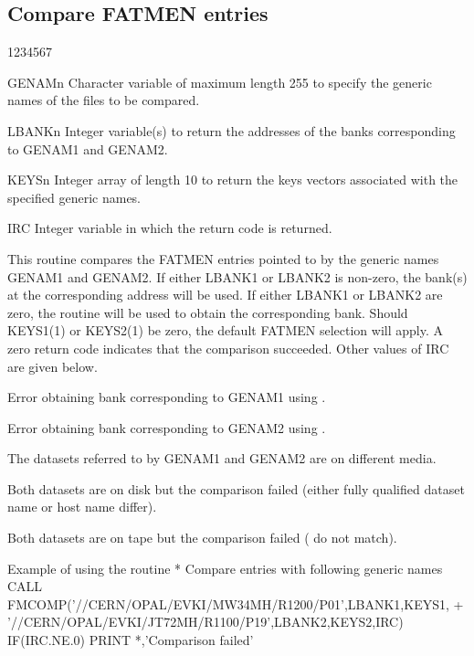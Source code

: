\subsection{Compare FATMEN entries}
\begin{DLtt}{1234567}
\item[GENAMn]
Character variable of maximum length 255 to specify the generic names
of the files to be compared.
\item[LBANKn]
Integer variable(s) to return the addresses of the banks
corresponding to GENAM1 and GENAM2.
\item[KEYSn]
Integer array of length 10 to return the keys vectors associated
with the specified generic names.
\item[IRC]
Integer variable in which the return code is returned.
\end{DLtt}
\par
This routine compares the FATMEN entries pointed to by the generic
names GENAM1 and GENAM2. If either LBANK1 or LBANK2 is non-zero,
the bank(s) at the corresponding address will be used.
If either LBANK1 or LBANK2 are zero, the routine  will
be used to obtain the corresponding bank. Should KEYS1(1) or KEYS2(1)
be zero, the default FATMEN selection will apply.
A zero return code indicates that the comparison succeeded. Other values
of IRC are given below.
\begin{OL}
\item
Error obtaining bank corresponding to GENAM1 using .
\item
Error obtaining bank corresponding to GENAM2 using .
\item
The datasets referred to by GENAM1 and GENAM2 are on different media.
\item
Both datasets are on disk but the comparison failed (either fully
qualified dataset name or host name differ).
\item
Both datasets are on tape but the comparison failed (
do not match).
\end{OL}
\begin{XMPt}{Example of using the \protect{} routine}
*     Compare entries with following generic names
      CALL FMCOMP('//CERN/OPAL/EVKI/MW34MH/R1200/P01',LBANK1,KEYS1,
     +            '//CERN/OPAL/EVKI/JT72MH/R1100/P19',LBANK2,KEYS2,IRC)
      IF(IRC.NE.0) PRINT *,'Comparison failed'
\end{XMPt}
